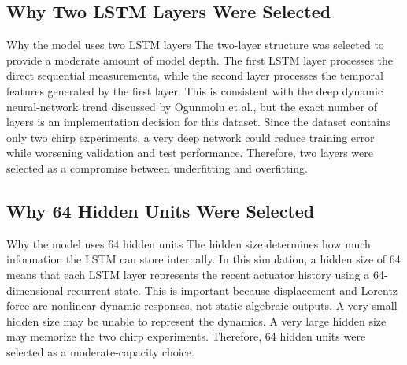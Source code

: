\documentclass[11pt]{article}
\begin{document}
\subsection{Why Two LSTM Layers Were Selected}
\begin{architecturedecisionbox}{Why the model uses two LSTM layers}
The two-layer structure was selected to provide a moderate amount of model depth. The first LSTM layer processes the direct sequential measurements, while the second layer processes the temporal features generated by the first layer. This is consistent with the deep dynamic neural-network trend discussed by Ogunmolu et al., but the exact number of layers is an implementation decision for this dataset. Since the dataset contains only two chirp experiments, a very deep network could reduce training error while worsening validation and test performance. Therefore, two layers were selected as a compromise between underfitting and overfitting.
\end{architecturedecisionbox}

\subsection{Why 64 Hidden Units Were Selected}
\begin{architecturedecisionbox}{Why the model uses 64 hidden units}
The hidden size determines how much information the LSTM can store internally. In this simulation, a hidden size of 64 means that each LSTM layer represents the recent actuator history using a 64-dimensional recurrent state. This is important because displacement and Lorentz force are nonlinear dynamic responses, not static algebraic outputs. A very small hidden size may be unable to represent the dynamics. A very large hidden size may memorize the two chirp experiments. Therefore, 64 hidden units were selected as a moderate-capacity choice.
\end{architecturedecisionbox}
\end{document}
